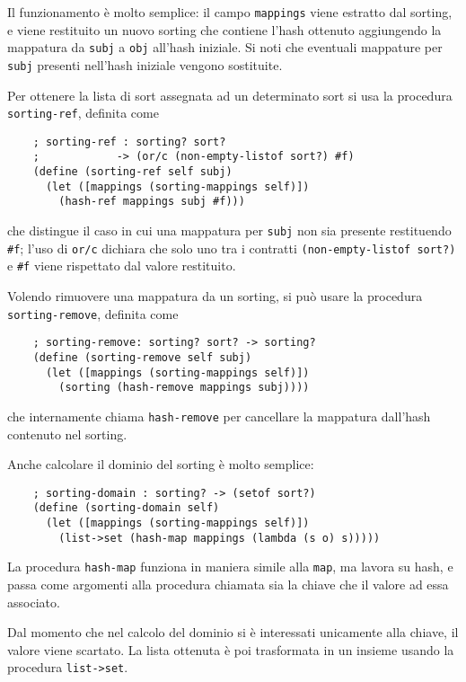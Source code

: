 Il funzionamento \`e molto semplice: il campo \lstinline{mappings}
viene estratto dal sorting, e viene restituito un nuovo sorting che
contiene l'hash ottenuto aggiungendo la mappatura da \lstinline{subj} a
\lstinline{obj} all'hash iniziale. Si noti che eventuali mappature per
\lstinline{subj} presenti nell'hash iniziale vengono sostituite.

Per ottenere la lista di sort assegnata ad un determinato sort si
usa la procedura \lstinline{sorting-ref}, definita come

\begin{lstlisting}
    ; sorting-ref : sorting? sort?
    ;            -> (or/c (non-empty-listof sort?) #f)
    (define (sorting-ref self subj)
      (let ([mappings (sorting-mappings self)])
        (hash-ref mappings subj #f)))
\end{lstlisting}

che distingue il caso in cui una mappatura per \lstinline{subj} non sia
presente restituendo \lstinline{#f}; l'uso di \lstinline{or/c} dichiara
che solo uno tra i contratti \lstinline{(non-empty-listof sort?)} e
\lstinline{#f} viene rispettato dal valore restituito.

Volendo rimuovere una mappatura da un sorting, si pu\`o usare la
procedura \lstinline{sorting-remove}, definita come

\begin{lstlisting}
    ; sorting-remove: sorting? sort? -> sorting?
    (define (sorting-remove self subj)
      (let ([mappings (sorting-mappings self)])
        (sorting (hash-remove mappings subj))))
\end{lstlisting}

che internamente chiama \lstinline{hash-remove} per cancellare la
mappatura dall'hash contenuto nel sorting.

Anche calcolare il dominio del sorting \`e molto semplice:

\begin{lstlisting}
    ; sorting-domain : sorting? -> (setof sort?)
    (define (sorting-domain self)
      (let ([mappings (sorting-mappings self)])
        (list->set (hash-map mappings (lambda (s o) s)))))
\end{lstlisting}

La procedura \lstinline{hash-map} funziona in maniera simile alla
\lstinline{map}, ma lavora su hash, e passa come argomenti alla
procedura chiamata sia la chiave che il valore ad essa associato.

Dal momento che nel calcolo del dominio si \`e interessati unicamente
alla chiave, il valore viene scartato. La lista ottenuta \`e poi
trasformata in un insieme usando la procedura \lstinline{list->set}.
